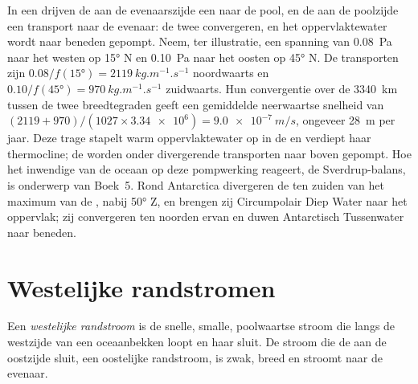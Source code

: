 In een  drijven de  aan de evenaarszijde een  naar de pool, en de  aan de poolzijde een transport naar de evenaar: de twee convergeren, en het oppervlaktewater wordt naar beneden gepompt. Neem, ter illustratie, een spanning van \qty{0.08}{Pa} naar het westen op \ang{15} N en
\qty{0.10}{Pa} naar het oosten op \ang{45} N. De transporten zijn $0.08/f(\ang{15}) = \qty{2119}{kg.m^{-1}.s^{-1}}$ noordwaarts en $0.10/f(\ang{45}) =
\qty{970}{kg.m^{-1}.s^{-1}}$ zuidwaarts. Hun convergentie over de \qty{3340}{km} tussen de twee breedtegraden geeft een gemiddelde neerwaartse snelheid van
$(2119 + 970)/(1027 \times \num{3.34e6}) = \qty{9.0e-7}{m/s}$, ongeveer \qty{28}{m} per jaar. Deze trage  stapelt warm oppervlaktewater op in de  en verdiept haar
thermocline; de  worden onder divergerende transporten naar boven gepompt. Hoe het inwendige van de oceaan op deze pompwerking reageert, de Sverdrup-balans, is onderwerp van Boek~5. Rond Antarctica divergeren de  ten zuiden van het maximum van de , nabij \ang{50} Z, en brengen zij Circumpolair Diep Water naar het oppervlak; zij convergeren ten noorden ervan en duwen Antarctisch Tussenwater naar beneden.

\section{Westelijke randstromen}\label{sec:b1:ocean-circulation:wbc}

\begin{definition}\label{def:b1:ocean-circulation:wbc}
Een \emph{westelijke randstroom} is de snelle, smalle, poolwaartse stroom die langs de westzijde van een oceaanbekken loopt en haar  sluit. De stroom die de  aan de oostzijde sluit,
een oostelijke randstroom, is zwak, breed en stroomt naar de evenaar.
\end{definition}

